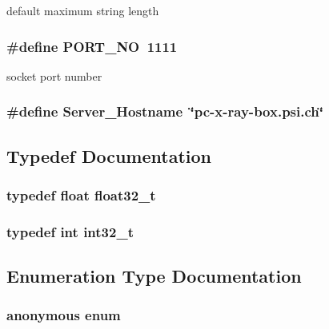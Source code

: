 default maximum string length 
\subsubsection{\setlength{\rightskip}{0pt plus 5cm}\#define PORT\_\-NO~1111}\label{commonDefs_8h_47a4d3bbd05894abbce0ffd1d266aa88}


socket port number 
\subsubsection{\setlength{\rightskip}{0pt plus 5cm}\#define Server\_\-Hostname~\char`\"{}pc-x-ray-box.psi.ch\char`\"{}}\label{commonDefs_8h_e296c7d6a55a9ae5a403ca07bd6ae93b}




\subsection{Typedef Documentation}
\subsubsection{\setlength{\rightskip}{0pt plus 5cm}typedef float \bf{float32\_\-t}}\label{commonDefs_8h_4611b605e45ab401f02cab15c5e38715}


\subsubsection{\setlength{\rightskip}{0pt plus 5cm}typedef int \bf{int32\_\-t}}\label{commonDefs_8h_32f2e37ee053cf2ce8ca28d1f74630e5}




\subsection{Enumeration Type Documentation}
\subsubsection{\setlength{\rightskip}{0pt plus 5cm}anonymous enum}\label{commonDefs_8h_06fc87d81c62e9abb8790b6e5713c55b}


